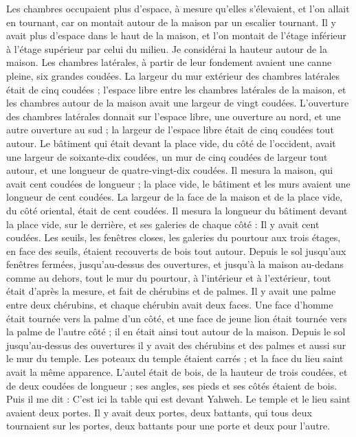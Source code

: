 \begin{multicols}{2}
Les chambres occupaient plus d'espace, à mesure qu'elles s'élevaient, et l'on allait en tournant, car on montait autour de la maison par un escalier tournant. Il y avait plus d'espace dans le haut de la maison, et l'on montait de l'étage inférieur à l'étage supérieur par celui du milieu.
Je considérai la hauteur autour de la maison. Les chambres latérales, à partir de leur fondement avaient une canne pleine, six grandes coudées.
La largeur du mur extérieur des chambres latérales était de cinq coudées ; l'espace libre entre les chambres latérales de la maison,
et les chambres autour de la maison avait une largeur de vingt coudées.
L'ouverture des chambres latérales donnait sur l'espace libre, une ouverture au nord, et une autre ouverture au sud ; la largeur de l'espace libre était de cinq coudées tout autour.
Le bâtiment qui était devant la place vide, du côté de l'occident, avait une largeur de soixante-dix coudées, un mur de cinq coudées de largeur tout autour, et une longueur de quatre-vingt-dix coudées.
Il mesura la maison, qui avait cent coudées de longueur ; la place vide, le bâtiment et les murs avaient une longueur de cent coudées.
La largeur de la face de la maison et de la place vide, du côté oriental, était de cent coudées.
Il mesura la longueur du bâtiment devant la place vide, sur le derrière, et ses galeries de chaque côté : Il y avait cent coudées.
Les seuils, les fenêtres closes, les galeries du pourtour aux trois étages, en face des seuils, étaient recouverts de bois tout autour. Depuis le sol jusqu'aux fenêtres fermées,
jusqu'au-dessus des ouvertures, et jusqu'à la maison au-dedans comme au dehors, tout le mur du pourtour, à l'intérieur et à l'extérieur, tout était d'après la mesure,
et fait de chérubins et de palmes. Il y avait une palme entre deux chérubins, et chaque chérubin avait deux faces.
Une face d'homme était tournée vers la palme d'un côté, et une face de jeune lion était tournée vers la palme de l'autre côté ; il en était ainsi tout autour de la maison.
Depuis le sol jusqu'au-dessus des ouvertures il y avait des chérubins et des palmes et aussi sur le mur du temple.
Les poteaux du temple étaient carrés ; et la face du lieu saint avait la même apparence.
L'autel était de bois, de la hauteur de trois coudées, et de deux coudées de longueur ; ses angles, ses pieds et ses côtés étaient de bois. Puis il me dit : C'est ici la table qui est devant Yahweh.
Le temple et le lieu saint avaient deux portes.
Il y avait deux portes, deux battants, qui tous deux tournaient sur les portes, deux battants pour une porte et deux pour l'autre.

\end{multicols}
